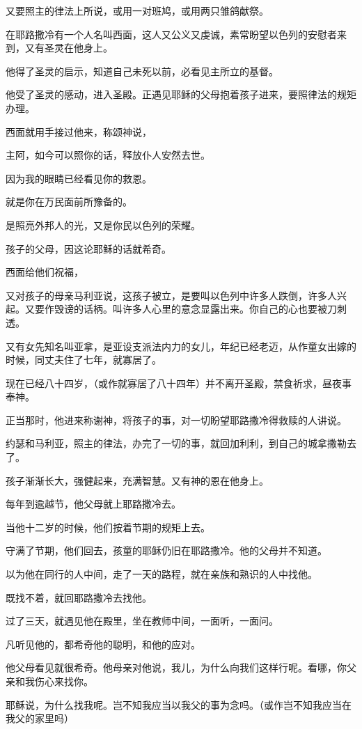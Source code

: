 \documentclass[12pt,oneside]{book}
\begin{document}
又要照主的律法上所说，或用一对班鸠，或用两只雏鸽献祭。

在耶路撒冷有一个人名叫西面，这人又公义又虔诚，素常盼望以色列的安慰者来到，又有圣灵在他身上。

他得了圣灵的启示，知道自己未死以前，必看见主所立的基督。

他受了圣灵的感动，进入圣殿。正遇见耶稣的父母抱着孩子进来，要照律法的规矩办理。

西面就用手接过他来，称颂神说，

主阿，如今可以照你的话，释放仆人安然去世。

因为我的眼睛已经看见你的救恩。

就是你在万民面前所豫备的。

是照亮外邦人的光，又是你民以色列的荣耀。

孩子的父母，因这论耶稣的话就希奇。

西面给他们祝福，

又对孩子的母亲马利亚说，这孩子被立，是要叫以色列中许多人跌倒，许多人兴起。又要作毁谤的话柄。叫许多人心里的意念显露出来。你自己的心也要被刀刺透。

又有女先知名叫亚拿，是亚设支派法内力的女儿，年纪已经老迈，从作童女出嫁的时候，同丈夫住了七年，就寡居了。

现在已经八十四岁，（或作就寡居了八十四年）并不离开圣殿，禁食祈求，昼夜事奉神。

正当那时，他进来称谢神，将孩子的事，对一切盼望耶路撒冷得救赎的人讲说。

约瑟和马利亚，照主的律法，办完了一切的事，就回加利利，到自己的城拿撒勒去了。

孩子渐渐长大，强健起来，充满智慧。又有神的恩在他身上。

每年到逾越节，他父母就上耶路撒冷去。

当他十二岁的时候，他们按着节期的规矩上去。

守满了节期，他们回去，孩童的耶稣仍旧在耶路撒冷。他的父母并不知道。

以为他在同行的人中间，走了一天的路程，就在亲族和熟识的人中找他。

既找不着，就回耶路撒冷去找他。

过了三天，就遇见他在殿里，坐在教师中间，一面听，一面问。

凡听见他的，都希奇他的聪明，和他的应对。

他父母看见就很希奇。他母亲对他说，我儿，为什么向我们这样行呢。看哪，你父亲和我伤心来找你。

耶稣说，为什么找我呢。岂不知我应当以我父的事为念吗。（或作岂不知我应当在我父的家里吗）
\end{document}
